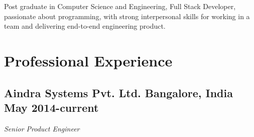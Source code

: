 \documentclass[11pt,letterpaper,sans]{moderncv}        %
\begin{document}
\pagestyle{empty}
\makecvtitle

\small{Post graduate in Computer Science and Engineering, Full Stack Developer, passionate about programming, with
strong interpersonal skills for working in a team and delivering end-to-end engineering product.}

\section{Professional Experience}

\vspace{2pt}

\subsection{\textbf{Aindra Systems Pvt. Ltd.} Bangalore, India \small{May 2014-current}}
\textit{Senior Product Engineer}
\end{document}
